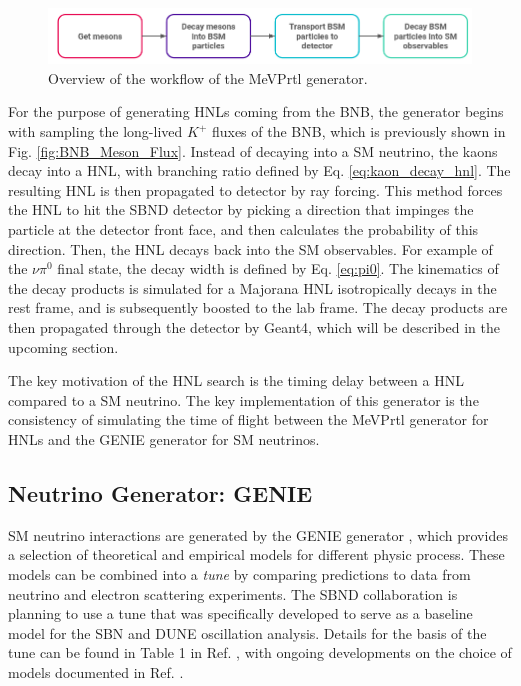 \begin{figure}[htbp!] 
\centering    
\includegraphics[width=1.0\textwidth]{MeVPrtl_Workflow}
\caption[MeVPrtl_Workflow]{
Overview of the workflow of the MeVPrtl generator.
}
\label{fig:MeVPrtl_Workflow}
\end{figure}

For the purpose of generating HNLs coming from the BNB, the generator begins with sampling the long-lived $K^{+}$ fluxes of the BNB, which is previously shown in Fig. \ref{fig:BNB_Meson_Flux}.
Instead of decaying into a SM neutrino, the kaons decay into a HNL, with branching ratio defined by Eq. \ref{eq:kaon_decay_hnl}.
The resulting HNL is then propagated to detector by ray forcing.
This method forces the HNL to hit the SBND detector by picking a direction that impinges the particle at the detector front face, and then calculates the probability of this direction. 
Then, the HNL decays back into the SM observables.
For example of the $\nu\pi^{0}$ final state, the decay width is defined by Eq. \ref{eq:pi0}.
The kinematics of the decay products is simulated for a Majorana HNL isotropically decays in the rest frame, and is subsequently boosted to the lab frame. 
The decay products are then propagated through the detector by Geant4, which will be described in the upcoming section.

The key motivation of the HNL search is the timing delay between a HNL compared to a SM neutrino.  
The key implementation of this generator is the consistency of simulating the time of flight between the MeVPrtl generator for HNLs and the GENIE generator for SM neutrinos.




\subsection{Neutrino Generator: GENIE}
\label{sec:gen_genie}



SM neutrino interactions are generated by the GENIE generator \cite{genie}, which provides a selection of theoretical and empirical models for different physic process.
These models can be combined into a \textit{tune} by comparing predictions to data from neutrino and electron scattering experiments.
The SBND collaboration is planning to use a tune that was specifically developed to serve as a baseline model for the SBN and DUNE oscillation analysis.
Details for the basis of the tune can be found in Table 1 in Ref. \cite{genie_tune}, with ongoing developments on the choice of models documented in Ref. \cite{genie_tune_github}.  


